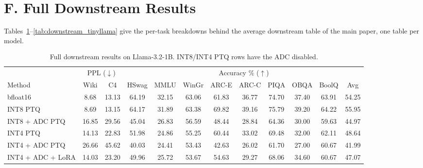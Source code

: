 \documentclass[letterpaper]{article} %
\theoremstyle{plain}
\begin{document}
\section{F. Full Downstream Results}

Tables~\ref{tab:downstream_llama}--\ref{tab:downstream_tinyllama} give the per-task breakdowns behind the average downstream table of the main paper, one table per model.

\begin{table}[t]
\centering
\setlength{\tabcolsep}{4pt}
\begin{tabular}{l|cc|ccccccccc}
\toprule
 & \multicolumn{2}{c|}{PPL ($\downarrow$)} & \multicolumn{9}{c}{Accuracy \% ($\uparrow$)} \\
Method & Wiki & C4 & HSwag & MMLU & WinGr & ARC-E & ARC-C & PIQA & OBQA & BoolQ & Avg \\
\midrule
bfloat16          & 8.68  & 13.13 & 64.19 & 32.15 & 63.06 & 61.83 & 36.77 & 74.70 & 37.40 & 63.91 & 54.25 \\
INT8 PTQ          & 8.69  & 13.15 & 64.17 & 31.89 & 63.38 & 69.82 & 39.16 & 75.79 & 39.20 & 64.22 & 55.95 \\
INT8 + ADC PTQ    & 16.85 & 29.56 & 45.04 & 26.83 & 56.59 & 48.44 & 28.84 & 64.36 & 30.00 & 59.63 & 44.97 \\
INT4 PTQ          & 14.13 & 22.83 & 51.98 & 24.86 & 55.25 & 60.44 & 33.02 & 69.48 & 32.00 & 62.11 & 48.64 \\
INT4 + ADC PTQ    & 26.66 & 45.62 & 40.03 & 24.41 & 53.43 & 42.63 & 26.02 & 61.70 & 27.00 & 60.67 & 41.99 \\
INT4 + ADC + LoRA & 14.03 & 23.20 & 49.96 & 25.72 & 53.67 & 54.63 & 29.27 & 68.06 & 34.60 & 60.67 & 47.07 \\
\bottomrule
\end{tabular}
\caption{Full downstream results on Llama-3.2-1B. INT8/INT4 PTQ rows have the ADC disabled.}
\label{tab:downstream_llama}
\end{table}
\end{document}
